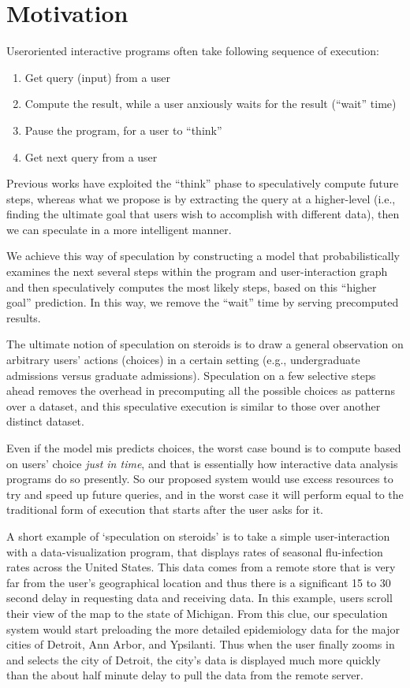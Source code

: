 \section{Motivation}
\label{sec:motiv}

User\-oriented interactive  programs often take following sequence of execution:
\begin{enumerate}
\item Get query (input) from a user
\item Compute the result, while a user anxiously waits for the result (``wait''
time)
\item Pause the program, for a user to ``think''
\item Get next query from a user
\end{enumerate}

Previous works have exploited the ``think'' phase to speculatively compute future
steps, whereas what we propose is by extracting the query at a  higher-level
(i.e., finding the ultimate goal that users wish to accomplish with different
data), then we can speculate in a more intelligent manner. 

We achieve this way of speculation by constructing a model that probabilistically
examines the next several steps within the program and user-interaction graph
and then speculatively computes the most likely steps, based on this ``higher
goal'' prediction. In this way, we remove the ``wait'' time by serving precomputed
results. 

The ultimate notion of speculation on steroids is to draw a general observation
on arbitrary users' actions (choices) in a certain setting (e.g., undergraduate
admissions versus graduate admissions). Speculation on a few selective steps
ahead removes the overhead in precomputing all the possible choices as patterns
over a dataset, and this speculative execution is similar to those over another
distinct dataset. 

Even if the model mis predicts choices, the worst case bound is to compute based
on users' choice {\it just in time}, and that is essentially how interactive
data analysis programs do so presently. So our proposed system would use excess
resources to try and speed up future queries, and in the worst case it will
perform equal to the traditional form of execution that starts after the user
asks for it. 

A short example of `speculation on steroids' is to take a simple
user-interaction with a data-visualization program, that displays rates of
seasonal flu-infection rates across the United States. This data comes from a
remote store that is very far from the user's geographical location and thus
there is a significant 15 to 30 second delay in requesting data and receiving
data. In this example, users scroll their view of the map to the state of
Michigan. From this clue, our speculation system would start preloading the more
detailed epidemiology data for the major cities of Detroit, Ann Arbor, and
Ypsilanti. Thus when the user finally zooms in and selects the city of Detroit,
the city's data is displayed much more quickly than the about half minute delay
to pull the data from the remote server.

